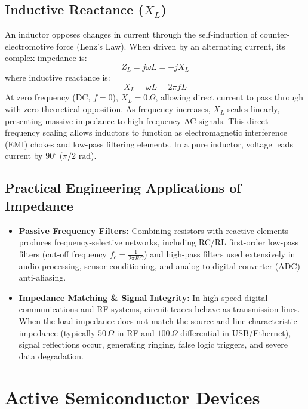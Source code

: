 \subsection{Inductive Reactance (\texorpdfstring{$X_L$}{X\_L})}
An inductor opposes changes in current through the self-induction of counter-electromotive force (Lenz's Law). When driven by an alternating current, its complex impedance is:
\begin{equation}
    Z_L = j\omega L = +j X_L
\end{equation}
where inductive reactance is:
\begin{equation}
    X_L = \omega L = 2\pi f L
\end{equation}
At zero frequency (DC, $f = 0$), $X_L = 0\,\Omega$, allowing direct current to pass through with zero theoretical opposition. As frequency increases, $X_L$ scales linearly, presenting massive impedance to high-frequency AC signals. This direct frequency scaling allows inductors to function as electromagnetic interference (EMI) chokes and low-pass filtering elements. In a pure inductor, voltage leads current by $90^\circ$ ($\pi/2\text{ rad}$).

\subsection{Practical Engineering Applications of Impedance}
\begin{itemize}[leftmargin=1.5em]
    \item \textbf{Passive Frequency Filters:} Combining resistors with reactive elements produces frequency-selective networks, including RC/RL first-order low-pass filters (cut-off frequency $f_c = \frac{1}{2\pi RC}$) and high-pass filters used extensively in audio processing, sensor conditioning, and analog-to-digital converter (ADC) anti-aliasing.
    \item \textbf{Impedance Matching \& Signal Integrity:} In high-speed digital communications and RF systems, circuit traces behave as transmission lines. When the load impedance does not match the source and line characteristic impedance (typically $50\,\Omega$ in RF and $100\,\Omega$ differential in USB/Ethernet), signal reflections occur, generating ringing, false logic triggers, and severe data degradation.
\end{itemize}

\section{Active Semiconductor Devices}

